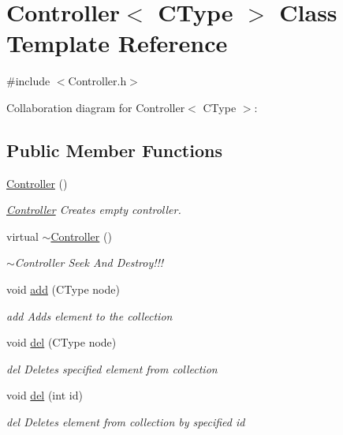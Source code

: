 \hypertarget{class_controller}{\section{Controller$<$ C\-Type $>$ Class Template Reference}
\label{class_controller}
}


{\ttfamily \#include $<$Controller.\-h$>$}



Collaboration diagram for Controller$<$ C\-Type $>$\-:
\subsection*{Public Member Functions}
\begin{DoxyCompactItemize}
\item 
\hyperlink{class_controller_a0f817aa1089f52e0290aa7a0edcebf97}{Controller} ()
\begin{DoxyCompactList}\small\item\em \hyperlink{class_controller}{Controller} Creates empty controller. \end{DoxyCompactList}\item 
virtual \hyperlink{class_controller_a8c9dbb3d1687c8ef62b6d29f6991124f}{$\sim$\-Controller} ()
\begin{DoxyCompactList}\small\item\em $\sim$\-Controller Seek And Destroy!!! \end{DoxyCompactList}\item 
void \hyperlink{class_controller_a56ad83e3295de8b9dbe11cbd74d5a468}{add} (C\-Type node)
\begin{DoxyCompactList}\small\item\em add Adds element to the collection \end{DoxyCompactList}\item 
void \hyperlink{class_controller_abb0469b161ecb5d2765e54568a08e5dc}{del} (C\-Type node)
\begin{DoxyCompactList}\small\item\em del Deletes specified element from collection \end{DoxyCompactList}\item 
void \hyperlink{class_controller_a60bee27ade39edf02479ca34ee6823ae}{del} (int id)
\begin{DoxyCompactList}\small\item\em del Deletes element from collection by specified id \end{DoxyCompactList}\item 

\end{DoxyCompactItemize}
